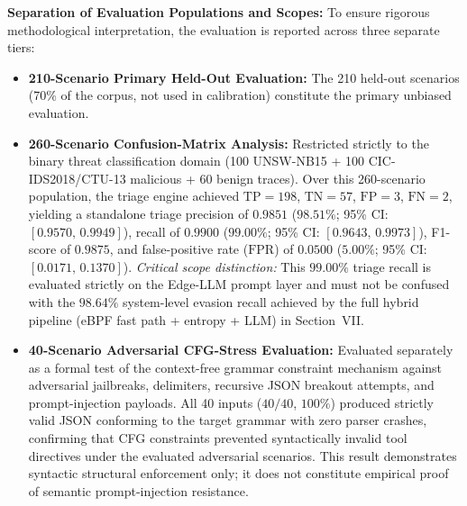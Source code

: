 \documentclass{ieeeaccess}
\renewcommand{\_}{\textunderscore\allowbreak}
\begin{document}
\textbf{Separation of Evaluation Populations and Scopes:}
To ensure rigorous methodological interpretation, the evaluation is reported across three separate tiers:
\begin{itemize}
  \item \textbf{210-Scenario Primary Held-Out Evaluation:} The 210 held-out scenarios (70\%
    of the corpus, not used in calibration) constitute the primary unbiased evaluation.
  \item \textbf{260-Scenario Confusion-Matrix Analysis:} Restricted strictly to the binary threat
    classification domain (100 UNSW-NB15 + 100 CIC-IDS2018/CTU-13 malicious + 60 benign traces).
    Over this 260-scenario population, the triage engine achieved $\text{TP}=198$, $\text{TN}=57$,
    $\text{FP}=3$, $\text{FN}=2$, yielding a standalone triage precision of $0.9851$ ($98.51\%$; 95\% CI: $[0.9570,\,0.9949]$),
    recall of $0.9900$ ($99.00\%$; 95\% CI: $[0.9643,\,0.9973]$), F1-score of $0.9875$, and false-positive rate ($\text{FPR}$) of $0.0500$ ($5.00\%$; 95\% CI: $[0.0171,\,0.1370]$).
    \textit{Critical scope distinction:} This $99.00\%$ triage recall is evaluated strictly on the
    Edge-LLM prompt layer and must not be confused with the $98.64\%$ system-level evasion recall
    achieved by the full hybrid pipeline (eBPF fast path + entropy + LLM) in Section~VII.
  \item \textbf{40-Scenario Adversarial CFG-Stress Evaluation:} Evaluated separately as a formal
    test of the context-free grammar constraint mechanism against adversarial jailbreaks,
    delimiters, recursive JSON breakout attempts, and prompt-injection payloads. All 40 inputs
    ($40/40$, $100\%$) produced strictly valid JSON conforming to the target grammar with zero
    parser crashes, confirming that CFG constraints prevented syntactically invalid tool directives
    under the evaluated adversarial scenarios. This result demonstrates syntactic structural
    enforcement only; it does not constitute empirical proof of semantic prompt-injection resistance.
\end{itemize}
\end{document}
